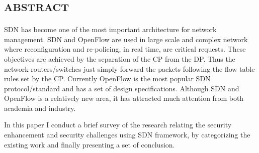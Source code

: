 %
\section*{\small \textsc{abstract}}
\ac{SDN} has become one of the most important architecture for network management. \ac{SDN} and OpenFlow are used in large scale and complex network where reconfiguration and re-policing, in real time, are critical requests. These objectives are achieved by the separation of the \ac{CP} from the \ac{DP}. Thus the network routers/switches just simply forward the packets following the flow table rules set by the \ac{CP}. Currently OpenFlow is the most popular \ac{SDN} protocol/standard and has a set of design specifications. Although \ac{SDN} and OpenFlow is a relatively new area, it has attracted much attention from both academia and industry.

In this paper I conduct a brief survey of the research relating the security enhancement and security challenges using \ac{SDN} framework, by categorizing the existing work and finally presenting a set of conclusion.